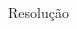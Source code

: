 \begin{frame}{Resolução}
\begin{textblock*}{10pt}
\begin{textblock*}{10pt}
\end{textblock*}

\end{textblock*}
\end{frame}